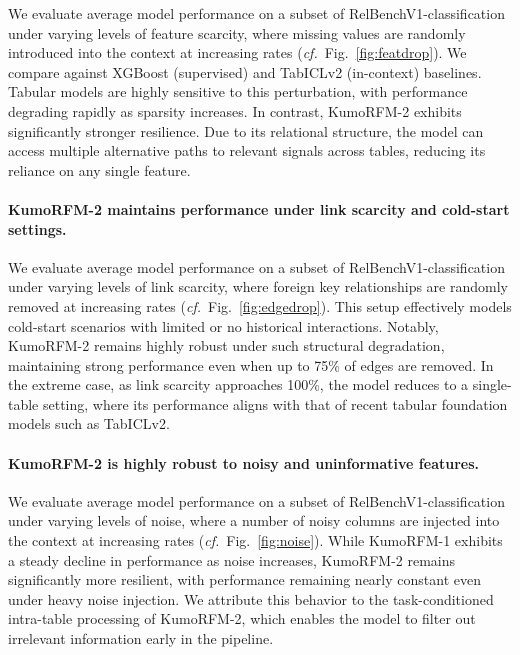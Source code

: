 \documentclass{article}
\newcommand{\onezero}{1\xspace}
\newcommand{\twozero}{2\xspace}
\newcommand{\name}{KumoRFM\xspace}
\newcommand{\nameone}{\name-\onezero}
\newcommand{\nametwo}{\name-\twozero}
\begin{document}
We evaluate average model performance on a subset of RelBenchV1-classification under varying levels of feature scarcity, where missing values are randomly introduced into the context at increasing rates (\emph{cf.}~Fig.~\ref{fig:featdrop}).
We compare against XGBoost
(supervised) and TabICLv2 (in-context) baselines.
Tabular models are highly sensitive to this perturbation, with performance degrading rapidly as sparsity increases.
In contrast, \nametwo exhibits significantly stronger resilience.
Due to its relational structure, the model can access multiple alternative paths to relevant signals across tables, reducing its reliance on any single feature.

\paragraph{\nametwo maintains performance under link scarcity and cold-start settings.}

We evaluate average model performance
on a subset of RelBenchV1-classification under varying levels of link scarcity, where foreign key relationships are randomly removed at increasing rates (\emph{cf.}~Fig.~\ref{fig:edgedrop}).
This setup effectively models cold-start scenarios with limited or no historical interactions.
Notably, \nametwo remains highly robust under such structural degradation, maintaining strong performance even when up to 75\% of edges are removed.
In the extreme case, as link scarcity approaches 100\%, the model reduces to a single-table setting, where its performance aligns with that of recent tabular foundation models such as TabICLv2.

\paragraph{\nametwo is highly robust to noisy and uninformative features.}

We evaluate average model performance
on a subset of RelBenchV1-classification under varying levels of noise, where a number of noisy columns are injected into the context at increasing rates (\emph{cf.}~Fig.~\ref{fig:noise}).
While \nameone exhibits a steady decline in performance as noise increases, \nametwo remains significantly more resilient, with performance remaining nearly constant even under heavy noise injection.
We attribute this behavior to the task-conditioned intra-table processing of \nametwo, which enables the model to filter out irrelevant information early in the pipeline.
\end{document}

